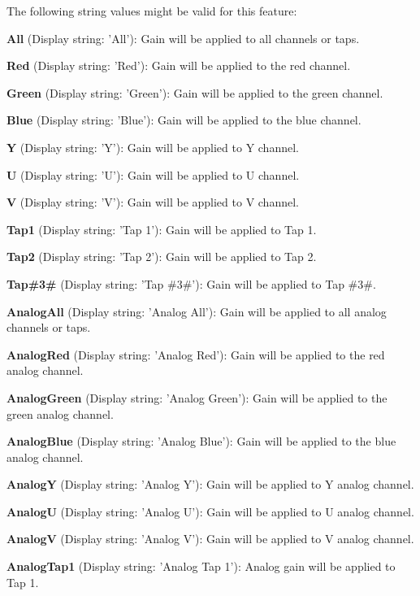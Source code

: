 The following string values might be valid for this feature\+:
\begin{DoxyItemize}
\item {\bfseries All} (Display string\+: 'All')\+: Gain will be applied to all channels or taps.
\item {\bfseries Red} (Display string\+: 'Red')\+: Gain will be applied to the red channel.
\item {\bfseries Green} (Display string\+: 'Green')\+: Gain will be applied to the green channel.
\item {\bfseries Blue} (Display string\+: 'Blue')\+: Gain will be applied to the blue channel.
\item {\bfseries Y} (Display string\+: 'Y')\+: Gain will be applied to Y channel.
\item {\bfseries U} (Display string\+: 'U')\+: Gain will be applied to U channel.
\item {\bfseries V} (Display string\+: 'V')\+: Gain will be applied to V channel.
\item {\bfseries Tap1} (Display string\+: 'Tap 1')\+: Gain will be applied to Tap 1.
\item {\bfseries Tap2} (Display string\+: 'Tap 2')\+: Gain will be applied to Tap 2.
\item {\bfseries Tap\#3\#} (Display string\+: 'Tap \#3\#')\+: Gain will be applied to Tap \#3\#.
\item {\bfseries Analog\+All} (Display string\+: 'Analog All')\+: Gain will be applied to all analog channels or taps.
\item {\bfseries Analog\+Red} (Display string\+: 'Analog Red')\+: Gain will be applied to the red analog channel.
\item {\bfseries Analog\+Green} (Display string\+: 'Analog Green')\+: Gain will be applied to the green analog channel.
\item {\bfseries Analog\+Blue} (Display string\+: 'Analog Blue')\+: Gain will be applied to the blue analog channel.
\item {\bfseries Analog\+Y} (Display string\+: 'Analog Y')\+: Gain will be applied to Y analog channel.
\item {\bfseries Analog\+U} (Display string\+: 'Analog U')\+: Gain will be applied to U analog channel.
\item {\bfseries Analog\+V} (Display string\+: 'Analog V')\+: Gain will be applied to V analog channel.
\item {\bfseries Analog\+Tap1} (Display string\+: 'Analog Tap 1')\+: Analog gain will be applied to Tap 1.

\end{DoxyItemize}
